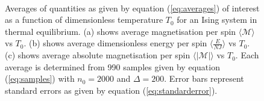 \documentclass[11pt]{iopart}
\begin{document}
\begin{figure}[t]
    \centering
    \quad
     \
          \
 
    \caption{Averages of quantities as given by equation (\ref{eq:averages}) of interest as a function of dimensionless temperature $T_0$ for an Ising system in thermal equilibrium. (a) shows average magnetisation per spin $\langle\mathcal{M}\rangle$ vs $T_0$. (b) shows average dimensionless energy per spin $\langle\frac{E}{NJ}\rangle$ vs $T_0$. (c) shows average absolute magnetisation per spin $\langle|\mathcal{M}|\rangle$ vs $T_0$. Each average is determined from 990 samples given by equation (\ref{eq:samples}) with $n_0 = 2000$ and $\Delta = 200$. Error bars represent standard errors as given by equation (\ref{eq:standarderror}).}
    \label{fig:equilibriumaverages}
\end{figure}
\end{document}
